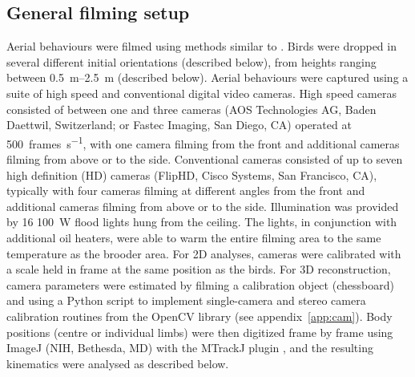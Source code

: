 \documentclass[10pt]{article}
\begin{document}
\subsection{General filming setup}
Aerial behaviours were filmed using methods similar to \citep{Jusufi:2008, Munk:2011, Jusufi:2011}.  Birds were dropped in several different initial orientations (described below), from heights ranging between \SIrange{0.5}{2.5}{\meter} (described below).  Aerial behaviours were captured using a suite of high speed and conventional digital video cameras.  High speed cameras consisted of between one and three cameras (AOS Technologies AG, Baden Daettwil, Switzerland; or Fastec Imaging, San Diego, CA) operated at \SI{500}{frames\per\second}, with one camera filming from the front and additional cameras filming from above or to the side.  Conventional cameras consisted of up to seven high definition (HD) cameras (FlipHD, Cisco Systems, San Francisco, CA), typically with four cameras filming at different angles from the front and additional cameras filming from above or to the side.  Illumination was provided by 16 \SI{100}{\watt} flood lights hung from the ceiling. The lights, in conjunction with additional oil heaters, were able to warm the entire filming area to the same temperature as the brooder area.  
	For 2D analyses, cameras were calibrated with a scale held in frame at the same position as the birds. For 3D reconstruction, camera parameters were estimated by filming a calibration object (chessboard) and using a Python script to implement single-camera and stereo camera calibration routines from the OpenCV library (see appendix~\ref{app:cam}).  Body positions (centre or individual limbs) were then digitized frame by frame using ImageJ (NIH, Bethesda, MD) with the MTrackJ plugin \citep{Meijering:2012}, and the resulting kinematics were analysed as described below. 
\end{document}
